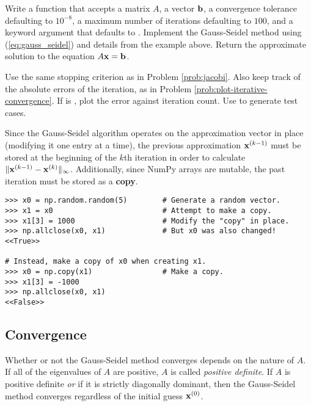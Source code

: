 \begin{problem} %
Write a function that accepts a matrix $A$, a vector $\mathbf{b}$, a convergence tolerance  defaulting to $10^{-8}$, a maximum number of iterations  defaulting to $100$, and a keyword argument  that defaults to .
Implement the Gauss-Seidel method using (\ref{eq:gauss_seidel}) and details from the example above. 
Return the approximate solution to the equation $A\mathbf{x} = \mathbf{b}$.

Use the same stopping criterion as in Problem \ref{prob:jacobi}.
Also keep track of the absolute errors of the iteration, as in Problem \ref{prob:plot-iterative-convergence}.
If  is , plot the error against iteration count.
Use  to generate test cases.

\begin{warn} %
Since the Gauss-Seidel algorithm operates on the approximation vector in place (modifying it one entry at a time), the previous approximation $\mathbf{x}^{(k-1)}$ must be stored at the beginning of the $k$th iteration in order to calculate $\|\mathbf{x}^{(k-1)} - \mathbf{x}^{(k)}\|_\infty$.
Additionally, since NumPy arrays are mutable, the past iteration must be stored as a \textbf{copy}.

\begin{lstlisting}
>>> x0 = np.random.random(5)        # Generate a random vector.
>>> x1 = x0                         # Attempt to make a copy.
>>> x1[3] = 1000                    # Modify the "copy" in place.
>>> np.allclose(x0, x1)             # But x0 was also changed!
<<True>>

# Instead, make a copy of x0 when creating x1.
>>> x0 = np.copy(x1)                # Make a copy.
>>> x1[3] = -1000
>>> np.allclose(x0, x1)
<<False>>
\end{lstlisting}
\end{warn}

\label{prob:gauss_seidel}
\end{problem}

\subsection*{Convergence} %

Whether or not the Gauss-Seidel method converges depends on the nature of $A$.
If all of the eigenvalues of $A$ are positive, $A$ is called \emph{positive definite}.
If $A$ is positive definite \emph{or} if it is strictly diagonally dominant, then the Gauss-Seidel method converges regardless of the initial guess $\mathbf{x}^{(0)}$.

